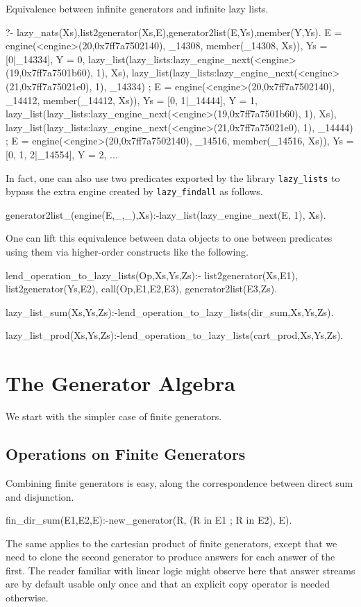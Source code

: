 \documentclass{new_tlp}
\begin{document}
\BX
Equivalence between infinite generators and infinite lazy lists.
\begin{codex}
?- lazy_nats(Xs),list2generator(Xs,E),generator2list(E,Ys),member(Y,Ys).
E = engine(<engine>(20,0x7ff7a7502140), _14308, member(_14308, Xs)),
Ys = [0|_14334],
Y = 0,
lazy_list(lazy_lists:lazy_engine_next(<engine>(19,0x7ff7a7501b60), 1), Xs),
lazy_list(lazy_lists:lazy_engine_next(<engine>(21,0x7ff7a75021e0), 1), _14334) ;
E = engine(<engine>(20,0x7ff7a7502140), _14412, member(_14412, Xs)),
Ys = [0, 1|_14444],
Y = 1,
lazy_list(lazy_lists:lazy_engine_next(<engine>(19,0x7ff7a7501b60), 1), Xs),
lazy_list(lazy_lists:lazy_engine_next(<engine>(21,0x7ff7a75021e0), 1), _14444) ;
E = engine(<engine>(20,0x7ff7a7502140), _14516, member(_14516, Xs)),
Ys = [0, 1, 2|_14554],
Y = 2,
...
\end{codex}
\EX
In fact, one can also use two predicates exported by the library {\tt lazy\_lists}
to bypass the extra engine created by {\tt lazy\_findall} as follows.
\begin{code}
generator2list_(engine(E,_,_),Xs):-lazy_list(lazy_engine_next(E, 1), Xs).
\end{code}

One can lift this equivalence between data objects to one between predicates using them via higher-order constructs like the following.

\begin{code}
lend_operation_to_lazy_lists(Op,Xs,Ys,Zs):-
  list2generator(Xs,E1),
  list2generator(Ys,E2),
  call(Op,E1,E2,E3),
  generator2list(E3,Zs).

lazy_list_sum(Xs,Ys,Zs):-lend_operation_to_lazy_lists(dir_sum,Xs,Ys,Zs).

lazy_list_prod(Xs,Ys,Zs):-lend_operation_to_lazy_lists(cart_prod,Xs,Ys,Zs).
\end{code}

\section{The Generator Algebra}
We start with the simpler case of finite generators.
 
\subsection{Operations on Finite  Generators}

Combining finite generators is easy, along the correspondence
between direct sum and disjunction.
\begin{code}
fin_dir_sum(E1,E2,E):-new_generator(R, (R in E1 ; R in E2), E).
\end{code}
The same applies to the cartesian product of finite generators, except that
we need to clone the second generator to produce answers for each answer of the first.
The reader familiar with linear logic might observe here that answer streams are
by default usable only once and that an explicit copy operator is needed otherwise.
\end{document}
